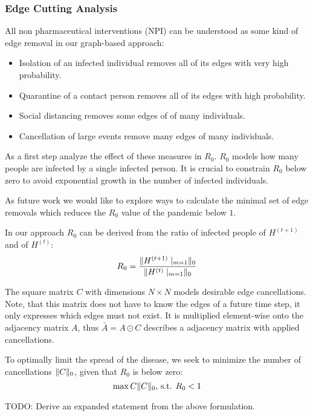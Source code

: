 \documentclass[]{article}
\DeclarePairedDelimiter\norm{\lVert}{\rVert}%
\begin{document}
\subsubsection{Edge Cutting Analysis}
All non pharmaceutical interventions (NPI) can be understood as some kind of edge removal in our graph-based approach:
\begin{itemize}
	\item Isolation of an infected individual removes all of its edges with very high probability.
	\item Quarantine of a contact person removes all of its edges with high probability.
	\item Social distancing removes some edges of of many individuals.
	\item Cancellation of large events remove many edges of many individuals.
\end{itemize}
As a first step analyze the effect of these measures in $R_0$.
$R_0$ models how many people are infected by a single infected person.
It is crucial to constrain $R_0$ below zero to avoid exponential growth in the number of infected individuals.


As future work we would like to explore ways to calculate the minimal set of edge removals which reduces the $R_0$ value of the pandemic below $1$.

In our approach $R_0$ can be derived from the ratio of infected people of $H^{(t+1)}$ and of $H^{(t)}$:
\begin{equation}
	R_0 = \frac{\norm{H^{(t+1)}\mid_{m=1}}_{0}}{\norm{H^{(t)}\mid_{m=1}}_{0}} %
\end{equation}

The square matrix $C$ with dimensions $N \times N$ models desirable edge cancellations.
Note, that this matrix does not have to know the edges of a future time step, it only expresses which edges must not exist.
It is multiplied element-wise onto the adjacency matrix $A$, thus $\bar{A} = A \odot C$ describes a adjacency matrix with applied cancellations.

To optimally limit the spread of the disease, we seek to minimize the number of cancellations $\norm{C}_0$, given that $R_0$ is below zero:
\begin{equation}
	\max{C} \norm{C}_0\text{, s.t. }R_0 < 1
\end{equation}

TODO: Derive an expanded statement from the above formulation.\\
\end{document}
